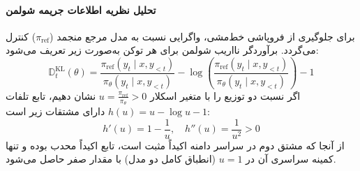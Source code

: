 \paragraph*{تحلیل نظریه اطلاعات جریمه  شولمن}
برای جلوگیری از فروپاشی خط‌مشی، واگرایی نسبت به مدل مرجع منجمد ($\pi_{\text{ref}}$) کنترل می‌گردد. برآوردگر نااریب شولمن \cite{schulman2020approximating} برای هر توکن به‌صورت زیر تعریف می‌شود:
\begin{equation}
    \mathbb{D}_{t}^{\mathrm{KL}}(\theta) = \frac{\pi_{\mathrm{ref}}(y_t \mid x, y_{<t})}{\pi_\theta(y_t \mid x, y_{<t})} - \log \left( \frac{\pi_{\mathrm{ref}}(y_t \mid x, y_{<t})}{\pi_\theta(y_t \mid x, y_{<t})} \right) - 1
\end{equation}
اگر نسبت دو توزیع را با متغیر اسکلار $u = \frac{\pi_{\mathrm{ref}}}{\pi_\theta} > 0$ نشان دهیم، تابع تلفات $h(u) = u - \log u - 1$ دارای مشتقات زیر است:
\begin{equation}
    h'(u) = 1 - \frac{1}{u}, \quad h''(u) = \frac{1}{u^2} > 0
\end{equation}
از آنجا که مشتق دوم در سراسر دامنه اکیداً مثبت است، تابع اکیداً محدب بوده و تنها کمینه سراسری آن در $u=1$ (انطباق کامل دو مدل) با مقدار صفر حاصل می‌شود.

